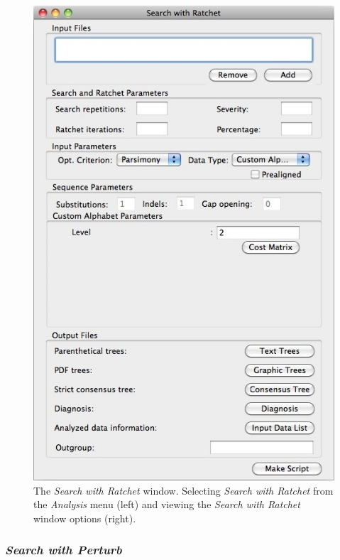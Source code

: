 {\begin{figure}
\begin{minipage}[c]{0.52\textwidth}
	   	\includegraphics[width=\textwidth]{doc/figures/searchwithratchet_window.jpg}
   	\end{minipage}
	
\caption{The \emph{Search with Ratchet} window. Selecting \emph{Search with Ratchet} from the \emph{Analysis} 
menu (left) and viewing the \emph{Search with Ratchet} window options (right).}
\label{fig:search_with_ratchet_window}
\end{figure}

\subsubsection*{\emph{Search with Perturb}}

}
